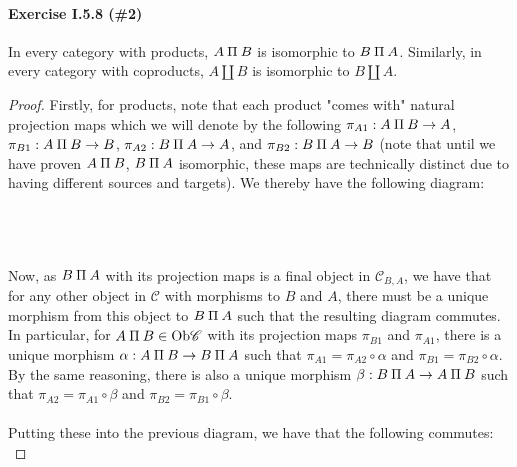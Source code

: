 \documentclass[12pt,letterpaper]{article}
\newcommand{\invamalg}{\mathbin{\text{\rotatebox[origin=c]{180}{$\amalg$}}}}
\begin{document}
\paragraph{Exercise I.5.8 (\#2)} In every category with products, $A\invamalg B$ is isomorphic to $B\invamalg A$. Similarly, in every category with coproducts, $A\amalg B$ is isomorphic to $B \amalg A$.
\begin{proof}
	Firstly, for products, note that each product "comes with" natural projection maps which we will denote by the following $\pi_{A1} : A\invamalg B \rightarrow A$, $\pi_{B1} : A\invamalg B \rightarrow B$, $\pi_{A2} : B\invamalg A \rightarrow A$, and $\pi_{B2} : B\invamalg A \rightarrow B$ (note that until we have proven $A\invamalg B$, $B\invamalg A$ isomorphic, these maps are technically distinct due to having different sources and targets). We thereby have the following diagram:\\\\
	\\\\
	Now, as $B\invamalg A$ with its projection maps is a final object in $\mathscr{C}_{B,A}$, we have that for any other object in $\mathscr{C}$ with morphisms to $B$ and $A$, there must be a unique morphism from this object to $B\invamalg A$ such that the resulting diagram commutes. In particular, for $A\invamalg B \in\mathrm{Ob }\mathscr{C}$ with its projection maps $\pi_{B1}$ and $\pi_{A1}$, there is a unique morphism $\alpha : A\invamalg B \rightarrow B\invamalg A$ such that $\pi_{A1} = \pi_{A2}\circ\alpha$ and $\pi_{B1} = \pi_{B2}\circ\alpha$. By the same reasoning, there is also a unique morphism $\beta : B\invamalg A \rightarrow A\invamalg B$ such that $\pi_{A2} = \pi_{A1}\circ\beta$ and $\pi_{B2} = \pi_{B1}\circ\beta$.\\\\
	Putting these into the previous diagram, we have that the following commutes:\\
	\begin{tikzcd}

\end{tikzcd}
\end{proof}
\end{document}
